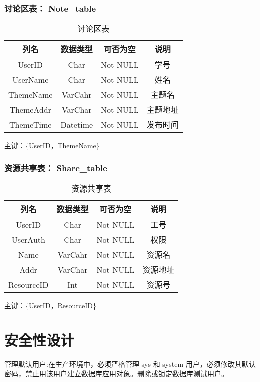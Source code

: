 \subsubsection{讨论区表： Note\_table}

\begin{table}[htbp]
\centering
\caption{讨论区表} \label{tab:classification}
\begin{tabular}{|c|c|c|c|}
    \hline
    列名 & 数据类型 & 可否为空 & 说明 \\
	\hline
    UserID & Char & Not NULL & 学号 \\
    \hline
    UserName & Char & Not NULL & 姓名 \\
    \hline
    ThemeName & VarCahr & Not NULL & 主题名 \\
    \hline
    ThemeAddr & VarChar & Not NULL & 主题地址 \\
    \hline
    ThemeTime & Datetime & Not NULL & 发布时间 \\
    \hline
\end{tabular}
\end{table}
主键：\{UserID，ThemeName\}


\subsubsection{资源共享表： Share\_table}

\begin{table}[htbp]
\centering
\caption{资源共享表} \label{tab:classification}
\begin{tabular}{|c|c|c|c|}
    \hline
    列名 & 数据类型 & 可否为空 & 说明 \\
	\hline
    UserID & Char & Not NULL & 工号 \\
    \hline
    UserAuth & Char & Not NULL & 权限 \\
    \hline
    Name & VarCahr & Not NULL & 资源名 \\
    \hline
    Addr & VarChar & Not NULL & 资源地址 \\
    \hline
    ResourceID & Int & Not NULL & 资源号 \\
    \hline
\end{tabular}
\end{table}
主键：\{UserID，ResourceID\}




\section{安全性设计}
管理默认用户:在生产环境中，必须严格管理 sys 和 system 用户，必须修改其默认密码，禁止用该用户建立数据库应用对象。删除或锁定数据库测试用户。

